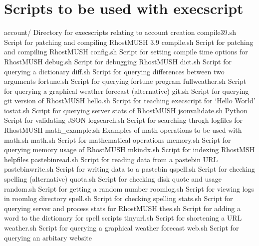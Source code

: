 \documentclass[letterpaper,10pt,english]{sphinxmanual}
\begin{document}
\chapter{Scripts to be used with execscript}
\label{\detokenize{37-execscripts:scripts-to-be-used-with-execscript}}\label{\detokenize{37-execscripts::doc}}
\sphinxAtStartPar
account/                       \textendash{} Directory for execscripts relating to account creation
compile39.sh                   \textendash{} Script for patching and compiling RhostMUSH 3.9
compile.sh                     \textendash{} Script for patching and compiling RhostMUSH
config.sh                      \textendash{} Script for setting compile time options for RhostMUSH
debug.sh                       \textendash{} Script for debugging RhostMUSH
dict.sh                        \textendash{} Script for querying a dictionary
diff.sh                        \textendash{} Script for querying differences between two arguments
fortune.sh                     \textendash{} Script for querying fortune program
fullweather.sh                 \textendash{} Script for querying a graphical weather forecast (alternative)
git.sh                         \textendash{} Script for querying git version of RhostMUSH
hello.sh                       \textendash{} Script for teaching execscript for ‘Hello World’
iostat.sh                      \textendash{} Script for querying server stats of RhostMUSH
jsonvalidate.sh                \textendash{} Python Script for validating JSON
logsearch.sh                   \textendash{} Script for searching throgh logfiles for RhostMUSH
math\_example.sh                \textendash{} Examples of math operations to be used with math.sh
math.sh                        \textendash{} Script for mathematical operations
memory.sh                      \textendash{} Script for querying memory usage of RhostMUSH
mkindx.sh                      \textendash{} Script for indexing RhostMSH helpfiles
pastebinread.sh                \textendash{} Script for reading data from a pastebin URL
pastebinwrite.sh               \textendash{} Script for writing data to a pastebin
qspell.sh                      \textendash{} Script for checking spelling (alternative)
quota.sh                       \textendash{} Script for checking disk quote and usage
random.sh                      \textendash{} Script for getting a random number
roomlog.sh                     \textendash{} Script for viewing logs in roomlog directory
spell.sh                       \textendash{} Script for checking spelling
stats.sh                       \textendash{} Script for querying server and process stats for RhostMUSH
thes.sh                        \textendash{} Script for adding a word to the dictionary for spell scripts
tinyurl.sh                     \textendash{} Script for shortening a URL
weather.sh                     \textendash{} Script for querying a graphical weather forecast
web.sh                         \textendash{} Script for querying an arbitary website
\end{document}

